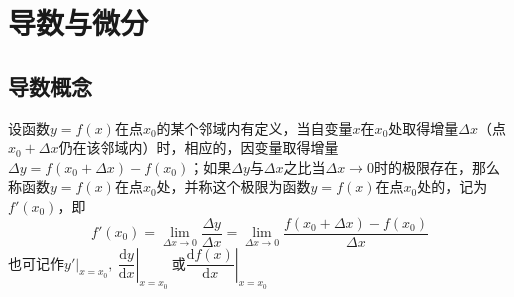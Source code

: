 \documentclass[lang=cn,10pt]{elegantbook}
\newcommand{\D}{\mathrm{d}}
\begin{document}
\newpage
\begin{problemset}[错题集]
	\item 
\end{problemset}

\chapter{导数与微分}

\section{导数概念}

\begin{definition}[导数]
	设函数\( y = f(x) \)在点\( x_{0} \)的某个邻域内有定义，当自变量\( x \)在\( x_{0} \)处取得增量\( \Delta x \)（点\( x_{0} + \Delta x \)仍在该邻域内）时，相应的，因变量取得增量\( \Delta y = f(x_{0} + \Delta x) - f(x_{0}) \)；如果\( \Delta y \)与\( \Delta x \)之比当\( \Delta x \to 0 \)时的极限存在，那么称函数\( y = f(x) \)在点\( x_{0} \)处，并称这个极限为函数\( y = f(x) \)在点\( x_{0} \)处的，记为\( f'(x_{0}) \)，即
	\[ f'(x_{0}) = \lim\limits_{\Delta x \to 0}\dfrac{\Delta y}{\Delta x} = \lim\limits_{\Delta x \to 0}\dfrac{f(x_{0} + \Delta x) - f(x_{0})}{\Delta x} \]
	也可记作\( y'|_{x = x_{0}},\ \left.\dfrac{\D y}{\D x}\right|_{x = x_{0}}\ \text{或}\left.\dfrac{\D f(x)}{\D x}\right|_{x = x_{0}} \)
\end{definition}

%
%
%
%
%
%
%
%
%
%
%
\end{document}
